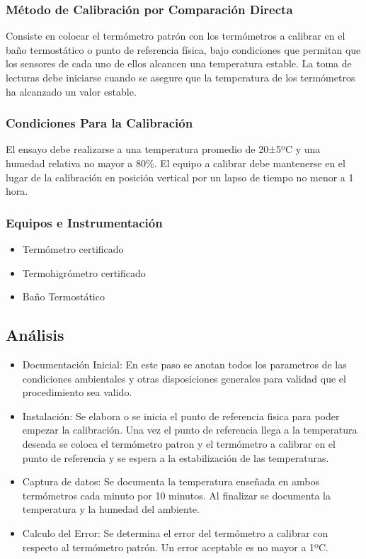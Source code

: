 \clearpage
\thispagestyle{plain}
		
		\subsubsection{Método de Calibración por Comparación Directa}
			\par 
				Consiste en colocar el termómetro patrón con los termómetros a calibrar en el baño
				termostático o punto de referencia física, bajo condiciones que permitan que los
				sensores de cada uno de ellos alcancen una temperatura estable. La toma de lecturas
				debe iniciarse cuando se asegure que la temperatura de los termómetros ha alcanzado
				un valor estable.
		\subsubsection{Condiciones Para la Calibración}
			\par 
				El ensayo debe realizarse a una temperatura promedio de 20±5ºC y una humedad
				relativa no mayor a 80\%. El equipo a calibrar debe mantenerse en el lugar de la
				calibración en posición vertical por un lapso de tiempo no menor a 1 hora.
		\subsubsection{Equipos e Instrumentación}
			\begin{itemize}
				\item Termómetro certificado
				\item Termohigrómetro certificado
				\item Baño Termostático
			\end{itemize}
		
	\subsection{Análisis}

		\begin{itemize}
			\item Documentación Inicial: En este paso se anotan todos los parametros de las condiciones ambientales y otras disposiciones generales para validad que el procedimiento sea valido.
			
			\item Instalación: Se elabora o se inicia el punto de referencia fisica para poder empezar la calibración. Una vez el punto de referencia llega a la temperatura deseada se coloca el termómetro patron y el termómetro a calibrar en el punto de referencia y se espera a la estabilización de las temperaturas.
			
			\item Captura de datos: Se documenta la temperatura enseñada en ambos termómetros cada minuto por 10 minutos. Al finalizar se documenta la temperatura y la humedad del ambiente.
			
			\item Calculo del Error: Se determina el error del termómetro a calibrar con respecto al termómetro patrón. Un error aceptable es no mayor a 1ºC.
		\end{itemize}
	
